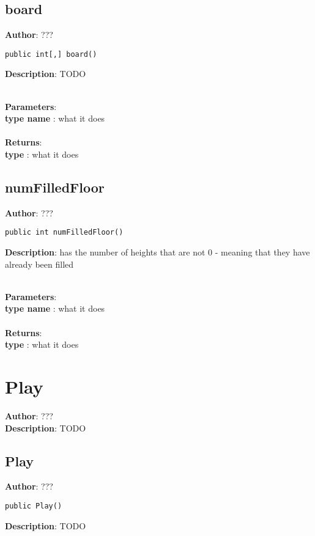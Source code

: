 \documentclass[12pt]{article}
\begin{document}
\subsection{board}
\textbf{Author}: ??? 
\vspace*{1\baselineskip}
\begin{lstlisting}
public int[,] board()
\end{lstlisting} 
\vspace*{1\baselineskip}
\textbf{Description}: TODO 


\textbf{\large{\\Parameters}}:\\
\textbf{type name }: what it does\\\textbf{\large{\\Returns}}:\\
\textbf{type }: what it does\\

\subsection{numFilledFloor}
\textbf{Author}: ??? 
\vspace*{1\baselineskip}
\begin{lstlisting}
public int numFilledFloor()
\end{lstlisting} 
\vspace*{1\baselineskip}
\textbf{Description}: has the number of heights that are not 0 - meaning that they have already been filled 


\textbf{\large{\\Parameters}}:\\
\textbf{type name }: what it does\\\textbf{\large{\\Returns}}:\\
\textbf{type }: what it does\\

\section{Play}
\textbf{Author}: ??? \\
\textbf{Description}: TODO \\



\subsection{Play}
\textbf{Author}: ??? 
\vspace*{1\baselineskip}
\begin{lstlisting}
public Play()
\end{lstlisting} 
\vspace*{1\baselineskip}
\textbf{Description}: TODO 
\end{document}
